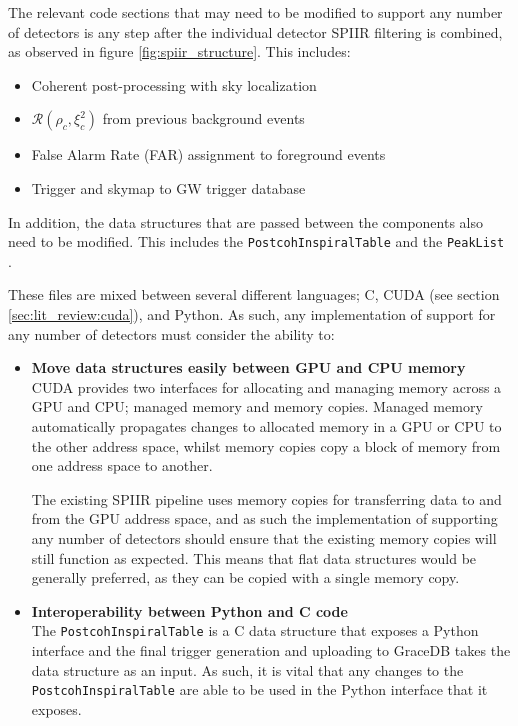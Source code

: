 \documentclass{article}
\begin{document}
The relevant code sections that may need to be modified to support any number of detectors is any step after the individual detector SPIIR filtering is combined, as observed in figure \ref{fig:spiir_structure}.
This includes:
\begin{itemize}
    \item Coherent post-processing with sky localization\\ \cite[\texttt{gstlal-spiir/gst/cuda/postcoh/}]{spiir}
    \item \(\mathcal{R}(\rho_c,\xi^2_c)\) from previous background events\\ \cite[\texttt{gstlal-spiir/gst/cuda/cohfar/cohfar\_accumbackground.c}]{spiir}
    \item False Alarm Rate (FAR) assignment to foreground events\\ \cite[\texttt{gstlal-spiir/gst/cuda/cohfar/cohfar\_assignfar.c}]{spiir}
    \item Trigger and skymap to GW trigger database\\ \cite[\texttt{gstlal-spiir/python/pipemodules/postcoh\_finalsink.py}]{spiir}
\end{itemize}

In addition, the data structures that are passed between the components also need to be modified.
This includes the \texttt{PostcohInspiralTable} \cite[\texttt{gstlal-spiir/python/pipemodules/postcohtable/}]{spiir} and the \texttt{PeakList} \cite[\texttt{gstlal-spiir/gst/cuda/postcoh/postcoh.h}]{spiir}.

These files are mixed between several different languages; C, CUDA (see section \ref{sec:lit_review:cuda}), and Python.
As such, any implementation of support for any number of detectors must consider the ability to:
\begin{itemize}
    \item \textbf{Move data structures easily between GPU and CPU memory}\\
        CUDA provides two interfaces for allocating and managing memory across a GPU and CPU; managed memory and memory copies.
        Managed memory automatically propagates changes to allocated memory in a GPU or CPU to the other address space, whilst memory copies copy a block of memory from one address space to another.
 
        The existing SPIIR pipeline uses memory copies for transferring data to and from the GPU address space, and as such the implementation of supporting any number of detectors should ensure that the existing memory copies will still function as expected.
        This means that flat data structures would be generally preferred, as they can be copied with a single memory copy.

    \item \textbf{Interoperability between Python and C code}\\
        The \texttt{PostcohInspiralTable} is a C data structure that exposes a Python interface and the final trigger generation and uploading to GraceDB takes the data structure as an input.
        As such, it is vital that any changes to the \texttt{PostcohInspiralTable} are able to be used in the Python interface that it exposes.
\end{itemize}
\end{document}
